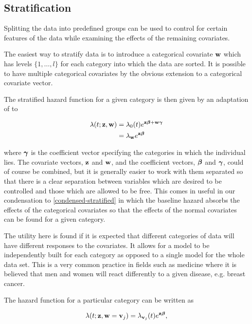 \subsection{Stratification}\label{stratification}

Splitting the data into predefined groups can be used to control for certain features of the data while examining the effects of the remaining covariates. 

The easiest way to stratify data is to introduce a categorical covariate $\textbf{w}$ which has levels $\{1,\ldots,l\}$ for each category into which the data are sorted. It is possible to have multiple categorical covariates by the obvious extension to a categorical covariate vector.

The stratified hazard function for a given category is then given by an adaptation of  to

\begin{align}
    \lambda(t;\textbf{z},\textbf{w})&=\lambda_0(t)e^{\textbf{z}\boldsymbol{\beta} + \textbf{w}\boldsymbol{\gamma}}\\
    \label{condensed-stratified} &=\lambda_{\textbf{w}}e^{\textbf{z}\boldsymbol{\beta}}
\end{align}

where $\boldsymbol{\gamma}$ is the coefficient vector specifying the categories in which the individual lies. The covariate vectors, $\textbf{z}$ and $\textbf{w}$, and the coefficient vectors, $\boldsymbol{\beta}$ and $\boldsymbol{\gamma}$, could of course be combined, but it is generally easier to work with them separated so that there is a clear separation between variables which are desired to be controlled and those which are allowed to be free. This comes in useful in our condensation to \ref{condensed-stratified} in which the baseline hazard absorbs the effects of the categorical covariates so that the effects of the normal covariates can be found for a given category.

The utility here is found if it is expected that different categories of data will have different responses to the covariates. It allows for a model to be independently built for each category as opposed to a single model for the whole data set. This is a very common practice in fields such as medicine where it is believed that men and women will react differently to a given disease, e.g. breast cancer.

The hazard function for a particular category can be written as

\begin{equation}
    \lambda(t;\textbf{z},\textbf{w}=\textbf{v}_j) = \lambda_{\textbf{v}_j}(t)e^{\textbf{z}\boldsymbol{\beta}},
\end{equation}

